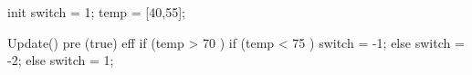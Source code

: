 
init {
 switch = 1;
 temp = [40,55];
}

Update() {
pre (true)
eff {
   if (temp > 70 ){
     if (temp < 75 ){
     switch = -1; 
    }
     else {
     switch = -2;
    }
  }
   else {
     switch = 1;
   }
}  
}